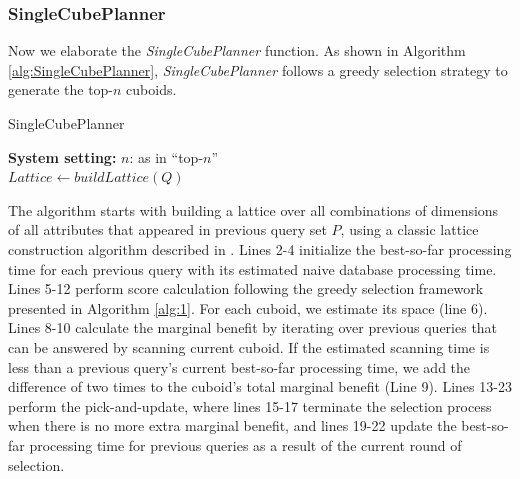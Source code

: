 	\subsubsection{SingleCubePlanner}
	\label{SingleCubePlanner}
	
	Now we elaborate the \emph{SingleCubePlanner} function. As shown in Algorithm \ref{alg:SingleCubePlanner}, \emph{SingleCubePlanner} follows a greedy selection strategy to generate the top-$n$ cuboids.
	
	\begin{algorithm}%
		\label{alg:SingleCubePlanner}
		\caption{SingleCubePlanner}
		\LinesNumbered
		\textbf{System setting:} $n$: as in ``top-$n$''\\
		$Lattice \leftarrow buildLattice(Q)$\;
		
	\end{algorithm}
	
	
	The algorithm starts with building a lattice over all combinations of dimensions of all attributes that appeared in previous query set $P$, using a classic lattice construction algorithm described in \cite{DBLP:journals/ipl/NourineR99}. Lines 2-4 initialize the best-so-far processing time for each previous query with its estimated naive database processing time. Lines 5-12 perform score calculation following the greedy selection framework presented in Algorithm \ref{alg:1}. For each cuboid, we estimate its space (line 6). Lines 8-10 calculate the marginal benefit by iterating over previous queries that can be answered by scanning current cuboid. If the estimated scanning time is less than a previous query's current best-so-far processing time, we add the difference of two times to the cuboid's total marginal benefit (Line 9). Lines 13-23 perform the pick-and-update, where lines 15-17 terminate the selection process when there is no more extra marginal benefit, and lines 19-22 update the best-so-far processing time for previous queries as a result of the current round of selection.
	
